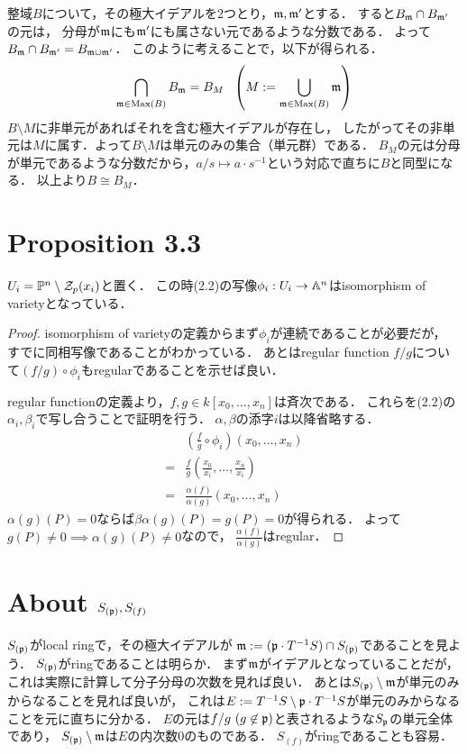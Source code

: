 \documentclass[a4paper]{jarticle}
\begin{document}
    整域$B$について，その極大イデアルを2つとり，$\mathfrak{m}, \mathfrak{m}'$とする．
    すると$B_{\mathfrak{m}} \cap B_{\mathfrak{m}'}$の元は，
    分母が$\mathfrak{m}$にも$\mathfrak{m}'$にも属さない元であるような分数である．
    よって$B_{\mathfrak{m}} \cap B_{\mathfrak{m}'}=B_{\mathfrak{m} \cup \mathfrak{m}'}$．
    このように考えることで，以下が得られる．
    \[ \bigcap_{\mathfrak{m} \in \operatorname{Max}(B)} B_{\mathfrak{m}} = B_{M} ~~ \left( M:=\bigcup_{\mathfrak{m} \in \operatorname{Max}(B)} \mathfrak{m} \right) \]
    $B \setminus M$に非単元があればそれを含む極大イデアルが存在し，
    したがってその非単元は$M$に属す．よって$B \setminus M$は単元のみの集合（単元群）である．
    $B_M$の元は分母が単元であるような分数だから，$a/s \mapsto a \cdot s^{-1}$という対応で直ちに$B$と同型になる．
    以上より$B \cong B_M$．

\section{Proposition 3.3}
    \begin{Prop}
        $U_i = \mathbb{P}^n \setminus \mathcal{Z}_p(x_i)$と置く．
        この時(2.2)の写像$\phi_i: U_i \to \mathbb{A}^n$はisomorphism of varietyとなっている．
    \end{Prop}
    \begin{proof}
        isomorphism of varietyの定義からまず$\phi_i$が連続であることが必要だが，
        すでに同相写像であることがわかっている．
        あとはregular function $f/g$について$(f/g) \circ \phi_i$もregularであることを示せば良い．

        regular functionの定義より，$f,g \in k[x_0, \dots, x_n]$は斉次である．
        これらを(2.2)の$\alpha_i, \beta_i$で写し合うことで証明を行う．
        $\alpha, \beta$の添字$i$は以降省略する．
        \begin{align*}
            {}& \left( \frac{f}{g} \circ \phi_i \right)(x_0, \dots, x_n) \\
            =&  \frac{f}{g} \left( \frac{x_0}{x_i}, \dots, \frac{x_n}{x_i} \right) \\
            =&  \frac{\alpha(f)}{\alpha(g)} (x_0, \dots, x_n)
        \end{align*}
        $\alpha(g)(P)=0$ならば$\beta \alpha(g)(P)=g(P)=0$が得られる．
        よって$g(P) \neq 0 \implies \alpha(g)(P) \neq 0$なので，
        $\frac{\alpha(f)}{\alpha(g)}$はregular．
    \end{proof}

\section{About $S_{(\mathfrak{p})}, S_{(f)}$}
    $S_{(\mathfrak{p})}$がlocal ringで，その極大イデアルが
    $\mathfrak{m}:=(\mathfrak{p} \cdot T^{-1}S) \cap S_{(\mathfrak{p})}$であることを見よう．
    $S_{(\mathfrak{p})}$がringであることは明らか．
    まず$\mathfrak{m}$がイデアルとなっていることだが，これは実際に計算して分子分母の次数を見れば良い．
    あとは$S_{(\mathfrak{p})} \setminus \mathfrak{m}$が単元のみからなることを見れば良いが，
    これは$E:=T^{-1}S \setminus \mathfrak{p} \cdot T^{-1}S$が単元のみからなることを元に直ちに分かる．
    $E$の元は$f/g ~(g \not \in \mathfrak{p})$と表されるような$S_{\mathfrak{p}}$の単元全体であり，
    $S_{(\mathfrak{p})} \setminus \mathfrak{m}$は$E$の内次数0のものである．
    $S_{(f)}$がringであることも容易．
\end{document}
